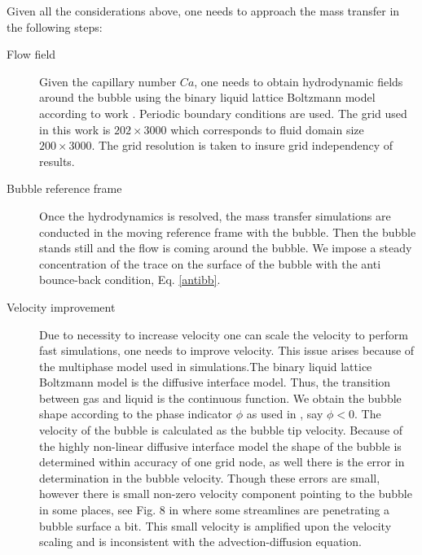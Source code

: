 \documentclass{article}
\begin{document}
Given all the considerations above, one needs to approach the mass transfer in the following
steps:
\begin{description}
 \item[Flow field] Given the capillary number $Ca$, one needs to obtain hydrodynamic fields around
the bubble using the binary liquid lattice Boltzmann model according to work
\cite{kuzmin-binary2d}. Periodic boundary conditions are used. The grid used in this work is
$202\times 3000$ which corresponds to fluid domain size $200\times3000$. The grid resolution is
taken to insure grid
independency of results.  
 \item[Bubble reference frame] Once the hydrodynamics is resolved, the mass transfer simulations
are conducted in the moving reference frame with the bubble. Then the bubble stands still and the
flow is coming around the
bubble. We impose a steady concentration of the trace on the surface
of the bubble with the anti bounce-back condition, Eq. \ref{antibb}.
 \item[Velocity improvement] Due to necessity to increase velocity one can scale the velocity to
perform fast simulations, one needs to improve velocity. This issue arises because of the
multiphase model used in simulations.The binary liquid lattice Boltzmann model is the diffusive
interface model. Thus, the
transition between gas and liquid is the continuous function. We obtain the bubble shape according
to the phase indicator $\phi$ as used in \cite{kuzmin-binary2d}, say $\phi<0$. The velocity of the
bubble is calculated as the bubble tip velocity. Because of the highly non-linear diffusive
interface model the shape of the bubble is determined within accuracy of one grid node, as well
there is the error in determination in the bubble velocity. Though these errors are small, however
there is small non-zero velocity component pointing to the bubble in some places, see Fig. 8 in
\cite{kuzmin-binary2d} where some streamlines are penetrating a bubble surface a bit.
This small velocity is amplified upon the velocity scaling and is inconsistent with the
advection-diffusion equation.



\end{description}
\end{document}
